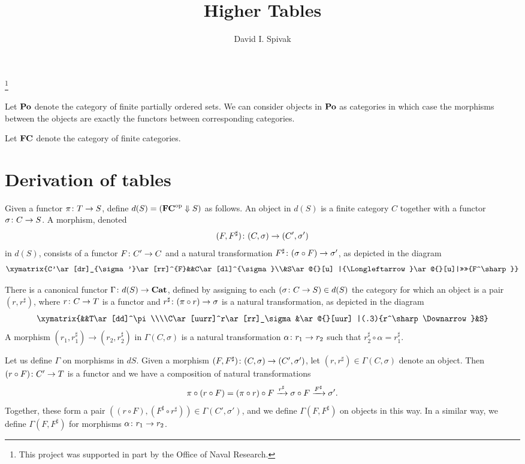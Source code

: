 \documentclass{amsart}
\makeatletter
\def\Down{\Downarrow}
\def\Po{{\bf Po}}
\def\FC{{\bf FC}}
\newcommand{\TriLeft}[7]{\xymatrix{#1\ar[dr]_{#2}\ar[rr]^{#3}&&#4\ar[dl]^{#5}\\&#6\ar@{}[u] |{\Longleftarrow}\ar@{}[u]|>>>>{#7}}}
\makeatother
\begin{document}
\author{David I. Spivak}

\thanks{This project was supported in part by the Office of Naval Research.}

\title{Higher Tables}

\maketitle

Let $\Po$ denote the category of finite partially ordered sets.  We can consider objects in $\Po$ as categories in which case the morphisms between the objects are exactly the functors between corresponding categories.

Let $\FC$ denote the category of finite categories.  

\section{Derivation of tables}

Given a functor $\pi\colon T\rightarrow S$, define $d(S)=(\FC\op\Down S)$ as follows.  An object in $d(S)$ is a finite category $C$ together with a functor $\sigma\colon C\rightarrow S$.  A morphism, denoted $$(F,F^\sharp)\colon(C,\sigma)\rightarrow(C',\sigma')$$ in $d(S)$, consists of a functor $F\colon C'\rightarrow C$ and a natural transformation $F^\sharp\colon (\sigma\circ F)\rightarrow\sigma'$, as depicted in the diagram $$\TriLeft{C'}{\sigma'}{F}{C}{\sigma}{S}{F^\sharp}$$ 

There is a canonical functor $\Gamma\colon d(S)\rightarrow{\bf Cat}$, defined by assigning to each $(\sigma\colon C\rightarrow S)\in d(S)$ the category for which an object is a pair $(r,r^\sharp)$, where $r\colon C\rightarrow T$ is a functor and $r^\sharp\colon(\pi\circ r)\rightarrow\sigma$ is a natural transformation, as depicted in the diagram $$\xymatrix{&&T\ar[dd]^\pi\\\\C\ar[uurr]^r\ar[rr]_\sigma&\ar@{}[uur] |(.3){r^\sharp\Downarrow}&S}$$  A morphism $(r_1,r_1^\sharp)\to(r_2,r_2^\sharp)$ in $\Gamma(C,\sigma)$ is a natural transformation $\alpha\colon r_1\rightarrow r_2$ such that $r_2^\sharp\circ\alpha=r_1^\sharp$.

Let us define $\Gamma$ on morphisms in $dS$.  Given a morphism $(F,F^\sharp)\colon (C,\sigma)\rightarrow(C',\sigma')$, let $(r,r^\sharp)\in\Gamma(C,\sigma)$ denote an object.  Then $(r\circ F)\colon C'\rightarrow T$ is a functor and we have a composition of natural transformations $$\pi\circ(r\circ F)=(\pi\circ r)\circ F\xrightarrow{r^\sharp}\sigma\circ F\xrightarrow{F^\sharp}\sigma'.$$  Together, these form a pair $((r\circ F),(F^\sharp\circ r^\sharp))\in\Gamma(C',\sigma')$, and we define $\Gamma(F,F^\sharp)$ on objects in this way.  In a similar way, we define $\Gamma(F,F^\sharp)$ for morphisms $\alpha\colon r_1\rightarrow r_2$.
\end{document}
